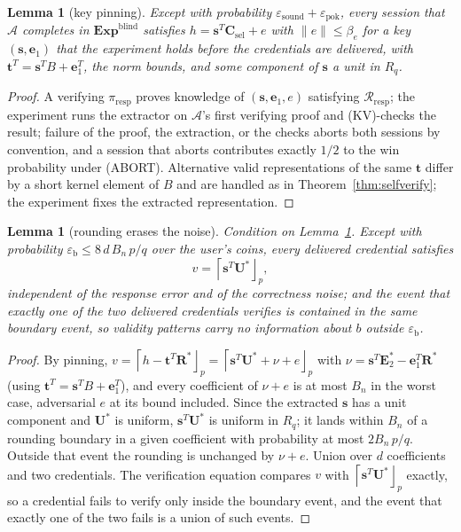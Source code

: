 \documentclass[11pt]{article}
\newcommand{\R}{R_q}
\newcommand{\roundp}[1]{\left\lceil #1\right\rfloor_p}
\newcommand{\Exp}{\mathbf{Exp}}
\newtheorem{lemma}[theorem]{Lemma}
\begin{document}
\begin{lemma}[key pinning]
\label{lem:pin}
Except with probability
$\varepsilon_{\mathrm{sound}}+\varepsilon_{\mathrm{pok}}$, every session that
$\mathcal A$ completes in $\Exp^{\mathrm{blind}}$ satisfies
$h=\mathbf s^{T}\mathbf C_{\mathrm{sel}}+e$ with $\|e\|\le\beta_e$ for a key
$(\mathbf s,\mathbf e_1)$ that the experiment holds before the credentials
are delivered, with $\mathbf t^{T}=\mathbf s^{T}B+\mathbf e_1^{T}$, the norm
bounds, and some component of $\mathbf s$ a unit in $\R$.
\end{lemma}

\begin{proof}
A verifying $\pi_{\mathrm{resp}}$ proves knowledge of
$(\mathbf s,\mathbf e_1,e)$ satisfying $\mathcal R_{\mathrm{resp}}$; the
experiment runs the extractor on $\mathcal A$'s first verifying proof and
(KV)-checks the result; failure of the proof, the extraction, or the checks
aborts both sessions by convention, and a session that aborts contributes
exactly $1/2$ to the win probability under (ABORT).  Alternative valid
representations of the same $\mathbf t$ differ by a short kernel element of
$B$ and are handled as in Theorem~\ref{thm:selfverify}; the experiment fixes
the extracted representation.
\end{proof}

\begin{lemma}[rounding erases the noise]
\label{lem:boundary}
Condition on Lemma~\ref{lem:pin}.  Except with probability
$\varepsilon_{\mathrm{b}}\le 8\,d\,B_n\,p/q$ over the user's coins, every
delivered credential satisfies
\[
 v=\roundp{\mathbf s^{T}\mathbf U^*},
\]
independent of the response error and of the correctness noise; and the
event that exactly one of the two delivered credentials verifies is
contained in the same boundary event, so validity patterns carry no
information about $b$ outside $\varepsilon_{\mathrm{b}}$.
\end{lemma}

\begin{proof}
By pinning,
$v=\roundp{h-\mathbf t^{T}\mathbf R^*}
 =\roundp{\mathbf s^{T}\mathbf U^*+\nu+e}$
with $\nu=\mathbf s^{T}\mathbf E_2^*-\mathbf e_1^{T}\mathbf R^*$ (using
$\mathbf t^{T}=\mathbf s^{T}B+\mathbf e_1^{T}$), and every coefficient of
$\nu+e$ is at most $B_n$ in the worst case, adversarial $e$ at its bound
included.  Since the extracted $\mathbf s$ has a unit component and
$\mathbf U^*$ is uniform, $\mathbf s^{T}\mathbf U^*$ is uniform in $\R$; it
lands within $B_n$ of a rounding boundary in a given coefficient with
probability at most $2B_n\,p/q$.  Outside that event the rounding is
unchanged by $\nu+e$.  Union over $d$ coefficients and two credentials.
The verification equation compares $v$ with $\roundp{\mathbf s^{T}\mathbf
U^*}$ exactly, so a credential fails to verify only inside the boundary
event, and the event that exactly one of the two fails is a union of such
events.
\end{proof}
\end{document}
